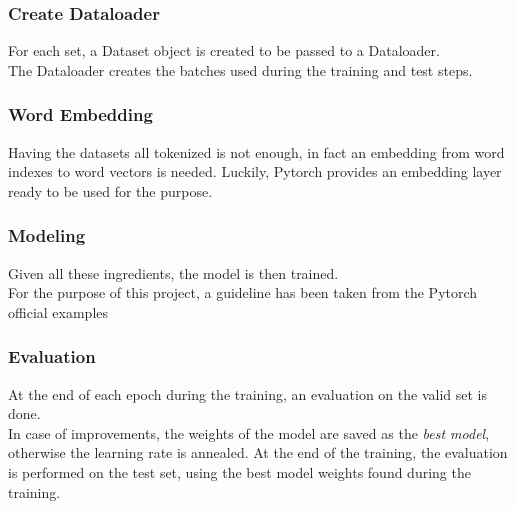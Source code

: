 \subsubsection{Create Dataloader}
For each set, a Dataset object is created to be passed to a Dataloader.\\
The Dataloader creates the batches used during the training and test steps.
\subsubsection{Word Embedding}
Having the datasets all tokenized is not enough, in fact an embedding from word indexes to word vectors is needed. Luckily, Pytorch provides an embedding layer ready to be used for the purpose.
\subsubsection{Modeling}
Given all these ingredients, the model is then trained. \\
For the purpose of this project, a guideline has been taken from the Pytorch official examples \cite{wordLanguageModel}
\subsubsection{Evaluation}
At the end of each epoch during the training, an evaluation on the valid set is done.\\ 
In case of improvements, the weights of the model are saved as the \textit{best model}, otherwise the learning rate is annealed. At the end of the training, the evaluation is performed on the test set, using the best model weights found during the training.